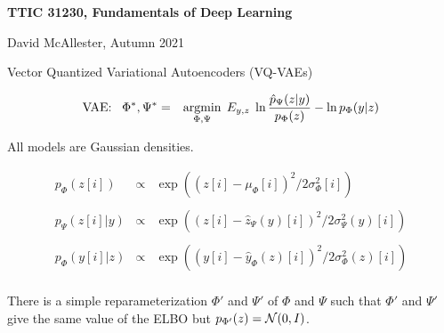 





{\Huge

  \centerline{\bf TTIC 31230, Fundamentals of Deep Learning}
  \bigskip
  \centerline{David McAllester, Autumn 2021}
  \vfill
  \vfil
  \centerline{Vector Quantized Variational Autoencoders (VQ-VAEs)}
  \vfill
  \vfill
{}

\vfill
\begin{eqnarray*}
\mbox{VAE:}\;\;\;\Phi^*,\Psi^* &  = & \operatorname*{argmin}_{\Phi,\Psi}\;E_{y,z}  \;\ln \frac{\hat{p}_\Psi(z|y)}{p_\Phi(z)}  - \ln p_\Phi(y|z) \\
\end{eqnarray*}

\vfill
All models are Gaussian densities.

\vfill
{\huge 
\begin{eqnarray*}
p_\Phi(z[i]) & \propto & \exp((z[i]-\mu_\Phi[i])^2/2\sigma^2_\Phi[i])\\
\\
p_\Psi(z[i]|y) & \propto & \exp((z[i]-\hat{z}_\Psi(y)[i])^2/2\sigma^2_\Psi(y)[i])\\
\\
p_\Phi(y[i]|z) & \propto & \exp((y[i]-\hat{y}_\Phi(z)[i])^2/2\sigma_\Phi^2(z)[i])\\
\end{eqnarray*}
}



There is a simple reparameterization $\Phi'$ and $\Psi'$ of $\Phi$ and $\Psi$ such that $\Phi'$ and $\Psi'$ give the same value of the ELBO
but $p_{\Phi'}(z) = {\cal N}(0,I)$.

}
